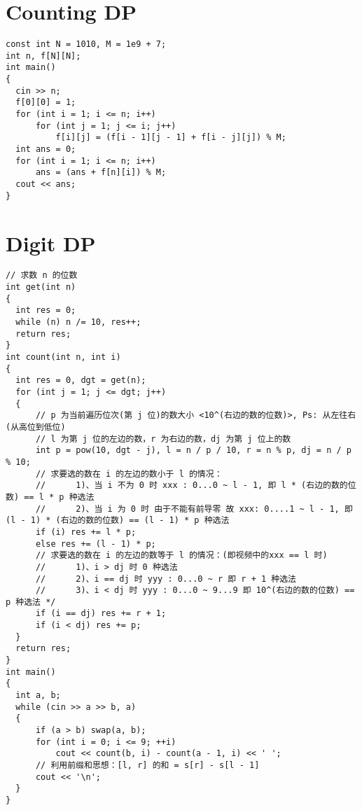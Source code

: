 \section{Counting DP}
\begin{lstlisting}
const int N = 1010, M = 1e9 + 7;
int n, f[N][N];
int main()
{
  cin >> n;
  f[0][0] = 1;
  for (int i = 1; i <= n; i++)
      for (int j = 1; j <= i; j++)
          f[i][j] = (f[i - 1][j - 1] + f[i - j][j]) % M;
  int ans = 0;
  for (int i = 1; i <= n; i++)
      ans = (ans + f[n][i]) % M;
  cout << ans;
}
\end{lstlisting}
\section{Digit DP}
\begin{lstlisting}
// 求数 n 的位数
int get(int n)
{
  int res = 0;
  while (n) n /= 10, res++;
  return res;
}
int count(int n, int i)
{
  int res = 0, dgt = get(n);
  for (int j = 1; j <= dgt; j++)
  {
      // p 为当前遍历位次(第 j 位)的数大小 <10^(右边的数的位数)>, Ps: 从左往右(从高位到低位)
      // l 为第 j 位的左边的数，r 为右边的数，dj 为第 j 位上的数
      int p = pow(10, dgt - j), l = n / p / 10, r = n % p, dj = n / p % 10;
      // 求要选的数在 i 的左边的数小于 l 的情况：
      //      1)、当 i 不为 0 时 xxx : 0...0 ~ l - 1, 即 l * (右边的数的位数) == l * p 种选法
      //      2)、当 i 为 0 时 由于不能有前导零 故 xxx: 0....1 ~ l - 1, 即 (l - 1) * (右边的数的位数) == (l - 1) * p 种选法
      if (i) res += l * p;
      else res += (l - 1) * p;
      // 求要选的数在 i 的左边的数等于 l 的情况：(即视频中的xxx == l 时)
      //      1)、i > dj 时 0 种选法
      //      2)、i == dj 时 yyy : 0...0 ~ r 即 r + 1 种选法
      //      3)、i < dj 时 yyy : 0...0 ~ 9...9 即 10^(右边的数的位数) == p 种选法 */
      if (i == dj) res += r + 1;
      if (i < dj) res += p;
  }
  return res;
}
int main()
{
  int a, b;
  while (cin >> a >> b, a)
  {
      if (a > b) swap(a, b);
      for (int i = 0; i <= 9; ++i)
          cout << count(b, i) - count(a - 1, i) << ' ';
      // 利用前缀和思想：[l, r] 的和 = s[r] - s[l - 1]
      cout << '\n';
  }
}
\end{lstlisting}
